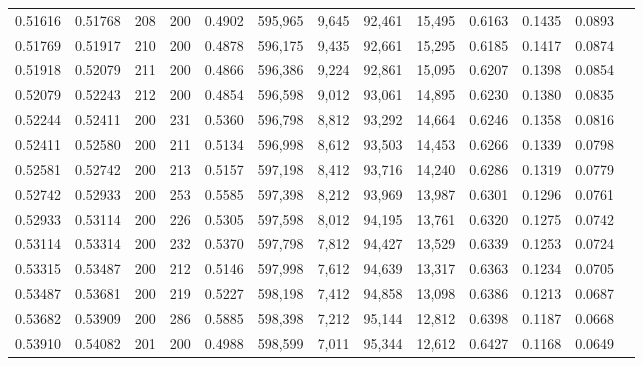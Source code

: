 \begin{tabular}{rrrrrrrrrrrrr}
0.51616 & 0.51768 &    208 & 200 &                                     0.4902 & 595,965 &   9,645 &  92,461 &  15,495 & 0.6163 & 0.1435 & 0.0893 \\
0.51769 & 0.51917 &    210 & 200 &                                     0.4878 & 596,175 &   9,435 &  92,661 &  15,295 & 0.6185 & 0.1417 & 0.0874 \\
0.51918 & 0.52079 &    211 & 200 &                                     0.4866 & 596,386 &   9,224 &  92,861 &  15,095 & 0.6207 & 0.1398 & 0.0854 \\
0.52079 & 0.52243 &    212 & 200 &                                     0.4854 & 596,598 &   9,012 &  93,061 &  14,895 & 0.6230 & 0.1380 & 0.0835 \\
0.52244 & 0.52411 &    200 & 231 &                                     0.5360 & 596,798 &   8,812 &  93,292 &  14,664 & 0.6246 & 0.1358 & 0.0816 \\
0.52411 & 0.52580 &    200 & 211 &                                     0.5134 & 596,998 &   8,612 &  93,503 &  14,453 & 0.6266 & 0.1339 & 0.0798 \\
0.52581 & 0.52742 &    200 & 213 &                                     0.5157 & 597,198 &   8,412 &  93,716 &  14,240 & 0.6286 & 0.1319 & 0.0779 \\
0.52742 & 0.52933 &    200 & 253 &                                     0.5585 & 597,398 &   8,212 &  93,969 &  13,987 & 0.6301 & 0.1296 & 0.0761 \\
0.52933 & 0.53114 &    200 & 226 &                                     0.5305 & 597,598 &   8,012 &  94,195 &  13,761 & 0.6320 & 0.1275 & 0.0742 \\
0.53114 & 0.53314 &    200 & 232 &                                     0.5370 & 597,798 &   7,812 &  94,427 &  13,529 & 0.6339 & 0.1253 & 0.0724 \\
0.53315 & 0.53487 &    200 & 212 &                                     0.5146 & 597,998 &   7,612 &  94,639 &  13,317 & 0.6363 & 0.1234 & 0.0705 \\
0.53487 & 0.53681 &    200 & 219 &                                     0.5227 & 598,198 &   7,412 &  94,858 &  13,098 & 0.6386 & 0.1213 & 0.0687 \\
0.53682 & 0.53909 &    200 & 286 &                                     0.5885 & 598,398 &   7,212 &  95,144 &  12,812 & 0.6398 & 0.1187 & 0.0668 \\
0.53910 & 0.54082 &    201 & 200 &                                     0.4988 & 598,599 &   7,011 &  95,344 &  12,612 & 0.6427 & 0.1168 & 0.0649 \\

\end{tabular}
